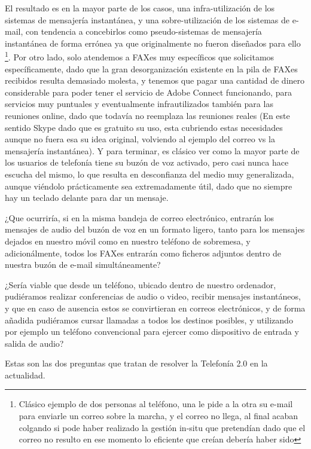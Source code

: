El resultado es en la mayor parte de los casos, una infra-utilización de los sistemas de mensajería instantánea, y una sobre-utilización de los sistemas de e-mail, con tendencia a concebirlos como pseudo-sistemas de mensajería instantánea de forma errónea ya que originalmente no fueron diseñados para ello \footnote{Clásico ejemplo de dos personas al teléfono, una le pide a la otra su e-mail para enviarle un correo sobre la marcha, y el correo no llega, al final acaban colgando si pode haber realizado la gestión in-situ que pretendían dado que el correo no resulto en ese momento lo eficiente que creían debería haber sido}. Por otro lado, solo atendemos a FAXes muy específicos que solicitamos específicamente, dado que la gran desorganización existente en la pila de FAXes recibidos resulta demasiado molesta, y tenemos que pagar una cantidad de dinero considerable para poder tener el servicio de Adobe Connect funcionando, para servicios muy puntuales y eventualmente infrautilizados también para las reuniones online, dado que todavía no reemplaza las reuniones reales (En este sentido Skype dado que es gratuito su uso, esta cubriendo estas necesidades aunque no fuera esa su idea original, volviendo al ejemplo del correo vs la mensajería instantánea). Y para terminar, es clásico ver como la mayor parte de los usuarios de telefonía tiene su buzón de voz activado, pero casi nunca hace escucha del mismo, lo que resulta en desconfianza del medio muy generalizada, aunque viéndolo prácticamente sea extremadamente útil, dado que no siempre hay un teclado delante para dar un mensaje.

¿Que ocurriría, si en la misma bandeja de correo electrónico, entrarán los mensajes de audio del buzón de voz en un formato ligero, tanto para los mensajes dejados en nuestro móvil como en nuestro teléfono de sobremesa, y adicionálmente, todos los FAXes entrarán como ficheros adjuntos dentro de nuestra buzón de e-mail simultáneamente? 

¿Sería viable que desde un teléfono, ubicado dentro de nuestro ordenador, pudiéramos realizar conferencias de audio o video, recibir mensajes instantáneos, y que en caso de ausencia estos se convirtieran en correos electrónicos, y de forma añadida pudiéramos cursar llamadas a todos los destinos posibles, y utilizando por ejemplo un teléfono convencional para ejercer como dispositivo de entrada y salida de audio?

Estas son las dos preguntas que tratan de resolver la Telefonía 2.0 en la actualidad.